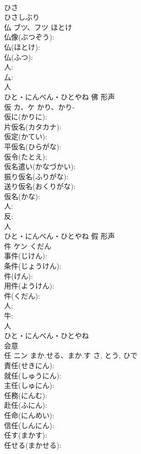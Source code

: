 \documentclass[8pt]{extreport}
\begin{document}
\begin{CJK}{UTF8}{min}
\\	ひさ 
\\	ひさしぶり 
\\	仏	ブツ、フツ	ほとけ		
\\	仏像(ぶつぞう): 
\\	仏(ほとけ): 
\\	仏(ふつ): 
\\	人: 
\\	厶: 
\\	人	
\\	ひと・にんべん・ひとやね	佛	形声 
\\	仮	カ、ケ	かり、かり-		
\\	仮に(かりに): 
\\	片仮名(カタカナ): 
\\	仮定(かてい): 
\\	平仮名(ひらがな): 
\\	仮令(たとえ): 
\\	仮名遣い(かなづかい): 
\\	振り仮名(ふりがな): 
\\	送り仮名(おくりがな): 
\\	仮名(かな): 
\\	人: 
\\	反: 
\\	人	
\\	ひと・にんべん・ひとやね	假	形声 
\\	件	ケン	くだん		
\\	事件(じけん): 
\\	条件(じょうけん): 
\\	件(けん): 
\\	用件(ようけん): 
\\	件(くだん): 
\\	人: 
\\	牛: 
\\	人	
\\	ひと・にんべん・ひとやね	
\\	会意 
\\	任	ニン	まか.せる、まか.す	さ, とう, ひで	
\\	責任(せきにん): 
\\	就任(しゅうにん): 
\\	主任(しゅにん): 
\\	任務(にんむ): 
\\	赴任(ふにん): 
\\	任命(にんめい): 
\\	信任(しんにん): 
\\	任す(まかす): 
\\	任せる(まかせる): 

\end{CJK}
\end{document}
